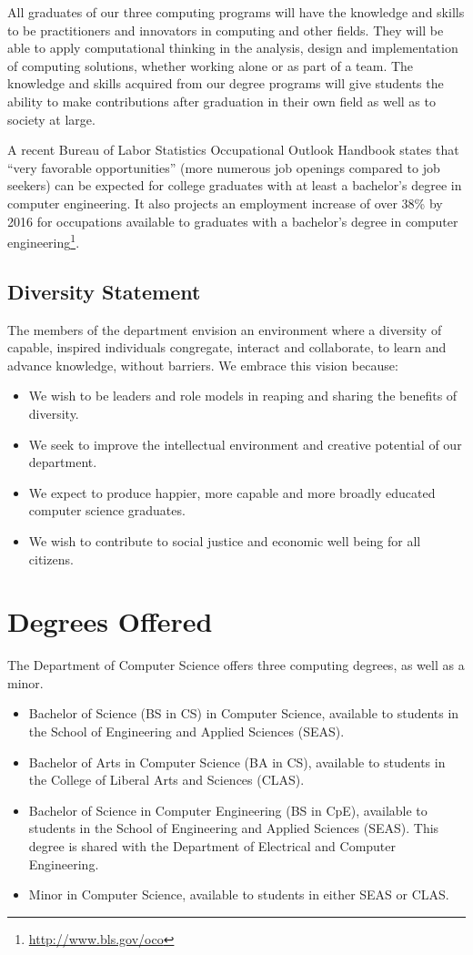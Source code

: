 \documentclass[10pt,letter]{book}
\newenvironment{itemlist}{
\begin{itemize}
\setlength{\itemsep}{0pt}
\setlength{\parskip}{0pt}}
{\end{itemize}}
\newcommand{\mysection}[1]{\section{#1}\renewcommand{\rightmark}{#1}}
\newcommand{\myurl}[1]{\footnote{\scriptsize\url{#1}}}
\begin{document}
All graduates of our three computing programs will have the knowledge
and skills to be practitioners and innovators in computing and other
fields.  They will be able to apply computational thinking in the
analysis, design and implementation of computing solutions, whether
working alone or as part of a team. The knowledge and skills acquired
from our degree programs will give students the ability to make
contributions after graduation in their own field as well as to
society at large.

A recent Bureau of Labor Statistics Occupational Outlook Handbook
states that ``very favorable opportunities'' (more numerous job
openings compared to job seekers) can be expected for college
graduates with at least a bachelor’s degree in computer
engineering. It also projects an employment increase of over 38\% by
2016 for occupations available to graduates with a bachelor’s degree
in computer engineering\myurl{http://www.bls.gov/oco}.

\subsection{Diversity Statement}

The members of the department envision an environment where a
diversity of capable, inspired individuals congregate, interact and
collaborate, to learn and advance knowledge, without barriers. We
embrace this vision because:

\begin{itemlist}
\item We wish to be leaders and role models in reaping and sharing the
 benefits of diversity.
\item We seek to improve the intellectual environment and creative
 potential of our department.
\item We expect to produce happier, more capable and more broadly
 educated computer science graduates.
\item We wish to contribute to social justice and economic well being
 for all citizens.
\end{itemlist}

\mysection{Degrees Offered}

The Department of Computer Science offers three computing degrees, as well as a minor.

\begin{itemlist}
\item Bachelor of Science (BS in CS) in Computer Science, available to
  students in the School of Engineering and Applied Sciences (SEAS).
\item Bachelor of Arts in Computer Science (BA in CS), available to
  students in the College of Liberal Arts and Sciences (CLAS).
\item Bachelor of Science in Computer Engineering (BS in CpE),
  available to students in the School of Engineering and Applied
  Sciences (SEAS). This degree is shared with the Department of
  Electrical and Computer Engineering.
\item Minor in Computer Science, available to students in either SEAS
  or CLAS.
\end{itemlist}
\end{document}
